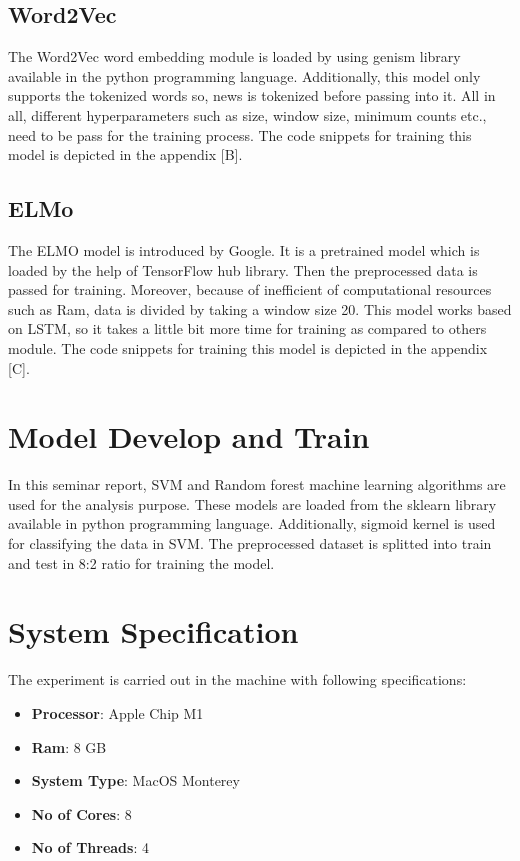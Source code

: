 \subsection{Word2Vec}
The Word2Vec word embedding module is loaded by using genism library available in the python programming language. Additionally, this model only supports the tokenized words so, news is tokenized before passing into it. All in all, different hyperparameters such as size, window size, minimum counts etc., need to be pass for the training process. The code snippets for training this model is depicted in the appendix [B]. 
\subsection{ELMo}
The ELMO model is introduced by Google. It is a pretrained model which is loaded by the help of TensorFlow hub library. Then the preprocessed data is passed for training. Moreover, because of inefficient of computational resources such as Ram, data is divided by taking a window size 20. This model works based on LSTM, so it takes a little bit more time for training as compared to others module. The code snippets for training this model is depicted in the appendix [C]. 
\section{Model Develop and Train}
In this seminar report, SVM and Random forest machine learning algorithms are used for the analysis purpose. These models are loaded from the sklearn library available in python programming language. Additionally, sigmoid kernel is used for classifying the data in SVM. The preprocessed dataset is splitted into train and test in 8:2 ratio for training the model.
\section{System Specification}
The experiment is carried out in the machine with following specifications:\
\begin{itemize}
  \item{\textbf{Processor}: Apple Chip M1}
    \item{\textbf{Ram}: 8 GB}
      \item{\textbf{System Type}: MacOS Monterey}
        \item{\textbf{No of Cores}: 8}
          \item{\textbf{No of Threads}: 4}
\end{itemize}